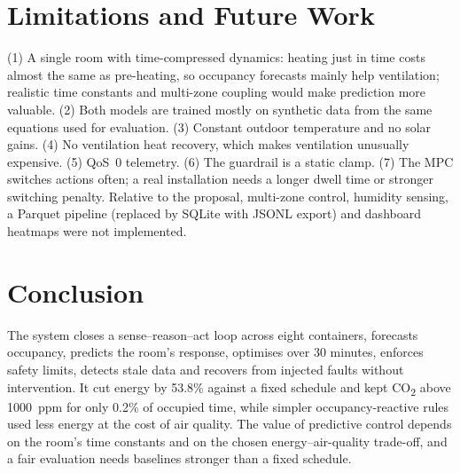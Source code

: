 \documentclass[conference,10pt]{IEEEtran}
\newcommand{\cotwo}{CO\textsubscript{2}}
\begin{document}
\section{Limitations and Future Work}\label{sec:limits}
(1) A single room with time-compressed dynamics: heating just in time costs almost the same as pre-heating, so occupancy forecasts mainly help ventilation; realistic time constants and multi-zone coupling would make prediction more valuable. (2) Both models are trained mostly on synthetic data from the same equations used for evaluation. (3) Constant outdoor temperature and no solar gains. (4) No ventilation heat recovery, which makes ventilation unusually expensive. (5) QoS~0 telemetry. (6) The guardrail is a static clamp. (7) The MPC switches actions often; a real installation needs a longer dwell time or stronger switching penalty. Relative to the proposal, multi-zone control, humidity sensing, a Parquet pipeline (replaced by SQLite with JSONL export) and dashboard heatmaps were not implemented.

\section{Conclusion}
The system closes a sense--reason--act loop across eight containers, forecasts occupancy, predicts the room's response, optimises over 30 minutes, enforces safety limits, detects stale data and recovers from injected faults without intervention. It cut energy by 53.8\% against a fixed schedule and kept \cotwo{} above 1000~ppm for only 0.2\% of occupied time, while simpler occupancy-reactive rules used less energy at the cost of air quality. The value of predictive control depends on the room's time constants and on the chosen energy--air-quality trade-off, and a fair evaluation needs baselines stronger than a fixed schedule.



\end{document}
